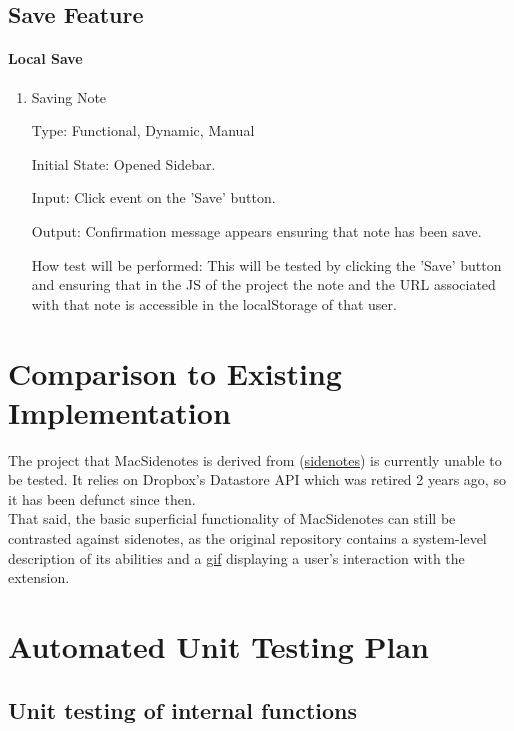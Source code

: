 \documentclass[12pt, titlepage]{article}
\begin{document}
\subsection{Save Feature}

\paragraph{Local Save}

\begin{enumerate}
	
	\item{Saving Note\\}
	
	Type: Functional, Dynamic, Manual
	
	Initial State: Opened Sidebar.
	
	Input: Click event on the 'Save' button.
	
	Output: Confirmation message appears ensuring that note has been save.
	
	How test will be performed: This will be tested by clicking the 'Save' button and 
	ensuring that in the JS  of the project the note and the URL associated with that note 
	is accessible in the localStorage of that user. 
	
\end{enumerate}
	
\section{Comparison to Existing Implementation}	
	The project that MacSidenotes is derived from 
	(\href{https://github.com/sidenotes/sidenotes}{sidenotes}) is currently 
	unable to be tested. It relies on Dropbox's Datastore API which was retired 
	2 years ago, so it has been defunct since then.\\
	That said, the basic superficial functionality of MacSidenotes can still be 
	contrasted against sidenotes, as the original repository contains a 
	system-level description of its abilities and a 
	\href{https://github.com/sidenotes/sidenotes/blob/master/images/Sidenotes-Screenflow.gif}
	{gif} displaying a user's interaction with the extension.
\section{Automated Unit Testing Plan}
		
\subsection{Unit testing of internal functions}
\end{document}

